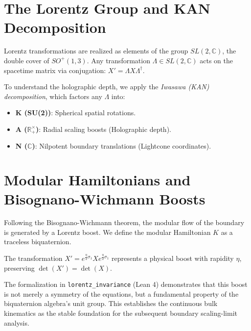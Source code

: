 \section{The Lorentz Group and KAN Decomposition}
Lorentz transformations are realized as elements of the group $SL(2, \mathbb{C})$, the double cover of $SO^+(1,3)$. Any transformation $\Lambda \in SL(2, \mathbb{C})$ acts on the spacetime matrix via conjugation: $X' = \Lambda X \Lambda^\dagger$. 

To understand the holographic depth, we apply the \textit{Iwasawa (KAN) decomposition}, which factors any $\Lambda$ into:
\begin{itemize}
    \item \textbf{K (SU(2))}: Spherical spatial rotations.
    \item \textbf{A ($\mathbb{R}_+^\times$)}: Radial scaling boosts (Holographic depth).
    \item \textbf{N ($\mathbb{C}$)}: Nilpotent boundary translations (Lightcone coordinates).
\end{itemize}

\section{Modular Hamiltonians and Bisognano-Wichmann Boosts}
Following the Bisognano-Wichmann theorem, the modular flow of the boundary is generated by a Lorentz boost. We define the modular Hamiltonian $K$ as a traceless biquaternion. 
\begin{theorem}
The transformation $X' = e^{\frac{\eta}{2}\sigma_1} X e^{\frac{\eta}{2}\sigma_1}$ represents a physical boost with rapidity $\eta$, preserving $\det(X') = \det(X)$.
\end{theorem}
The formalization in \texttt{lorentz\_invariance} (Lean 4) demonstrates that this boost is not merely a symmetry of the equations, but a fundamental property of the biquaternion algebra's unit group. This establishes the continuous bulk kinematics as the stable foundation for the subsequent boundary scaling-limit analysis.
